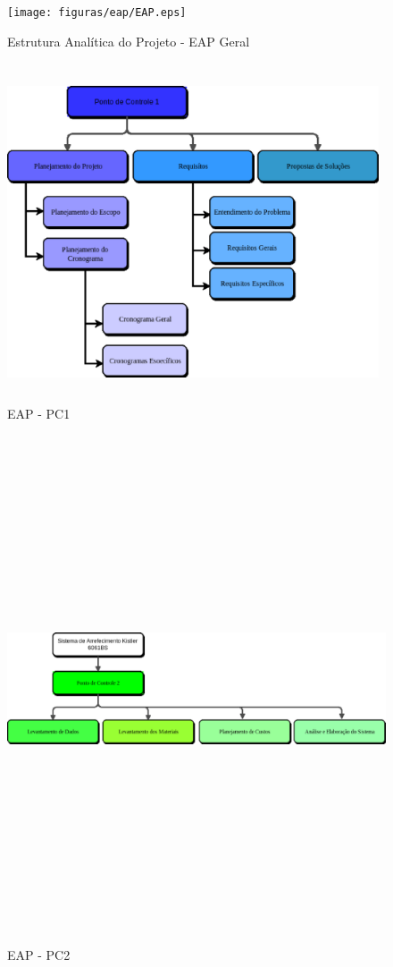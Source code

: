 \begin{figure}[!htb]
    \centering
    \texttt{[image: figuras/eap/EAP.eps]}
    \caption{Estrutura Analítica do Projeto - EAP Geral}
 \end{figure}

 \begin{figure}[!htb]
    \centering
    \includegraphics[width=11cm, height=10cm, keepaspectratio=true]{figuras/eap/EAP_1.eps}
    \caption{EAP - PC1}
 \end{figure}

 \begin{figure}[!htb]
    \centering
    \includegraphics[width=17cm, height=15cm, keepaspectratio=true]{figuras/eap/EAP_2.eps}
    \caption{EAP - PC2}
 \end{figure}

